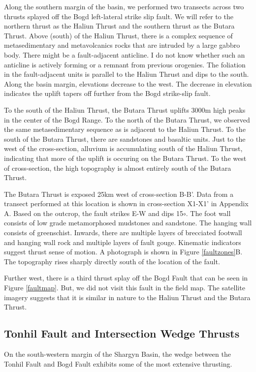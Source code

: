 Along the southern margin of the basin, we performed two transects across two thrusts splayed off the Bogd left-lateral strike slip fault. We will refer to the northern thrust as the Haliun Thrust and the southern thrust as the Butara Thrust. Above (south) of the Haliun Thrust, there is a complex sequence of metasedimentary and metavolcanics rocks that are intruded by a large gabbro body. There might be a fault-adjacent anticline. I do not know whether such an anticline is actively forming or a remnant from previous orogenies. The foliation in the fault-adjacent units is parallel to the Haliun Thrust and dips to the south. Along the basin margin, elevations decrease to the west. The decrease in elevation indicates the uplift tapers off further from the Bogd strike-slip fault. 

To the south of the Haliun Thrust, the Butara Thrust uplifts 3000m high peaks in the center of the Bogd Range. To the north of the Butara Thrust, we observed the same metasedimentary sequence as is adjacent to the Haliun Thrust. To the south of the Butara Thrust, there are sandstones and basaltic units. Just to the west of the cross-section, alluvium is accumulating south of the Haliun Thrust, indicating that more of the uplift is occuring on the Butara Thrust. To the west of cross-section, the high topography is almost entirely south of the Butara Thrust. 

The Butara Thrust is exposed 25km west of cross-section B-B'. Data from a transect performed at this location is shown in cross-section X1-X1' in Appendix A. Based on the outcrop, the fault strikes E-W and dips 15$\circ$. The foot wall consists of low grade metamorphosed mudstones and sandstone. The hanging wall consists of greenschist. Inwards, there are multiple layers of brecciated footwall and hanging wall rock and multiple layers of fault gouge. Kinematic indicators suggest thrust sense of motion. A photograph is shown in Figure \ref{faultzones}B. The topography rises sharply directly south of the location of the fault.

Further west, there is a third thrust splay off the Bogd Fault that can be seen in Figure \ref{faultmap}. But, we did not visit this fault in the field map. The satellite imagery suggests that it is similar in nature to the Haliun Thrust and the Butara Thrust.

\subsection{Tonhil Fault and Intersection Wedge Thrusts}
On the south-western margin of the Shargyn Basin, the wedge between the Tonhil Fault and Bogd Fault exhibits some of the most extensive thrusting. 

